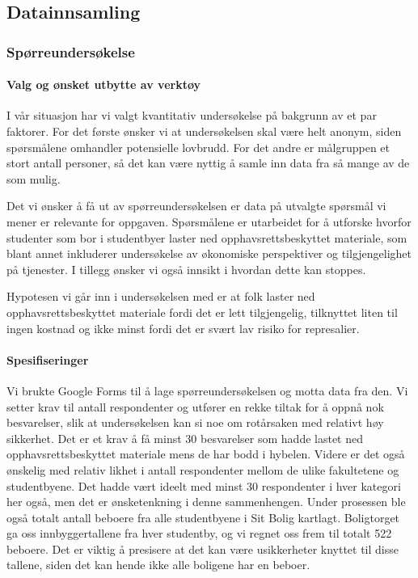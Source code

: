 \subsection{Datainnsamling}

\subsubsection{Spørreundersøkelse}

\paragraph{Valg og ønsket utbytte av verktøy}
I vår situasjon har vi valgt kvantitativ undersøkelse på bakgrunn av et par faktorer. For det første ønsker vi at undersøkelsen skal være helt anonym, siden spørsmålene omhandler potensielle lovbrudd. For det andre er målgruppen et stort antall personer, så det kan være nyttig å samle inn data fra så mange av de som mulig. 

Det vi ønsker å få ut av spørreundersøkelsen er data på utvalgte spørsmål vi mener er relevante for oppgaven. Spørsmålene er utarbeidet for å utforske hvorfor studenter som bor i studentbyer laster ned opphavsrettsbeskyttet materiale, som blant annet inkluderer undersøkelse av økonomiske perspektiver og tilgjengelighet på tjenester. I tillegg ønsker vi også innsikt i hvordan dette kan stoppes.

Hypotesen vi går inn i undersøkelsen med er at folk laster ned opphavsrettsbeskyttet materiale fordi det er lett tilgjengelig, tilknyttet liten til ingen kostnad og ikke minst fordi det er svært lav risiko for represalier.

\paragraph{Spesifiseringer}
Vi brukte Google Forms til å lage spørreundersøkelsen og motta data fra den. Vi setter krav til antall respondenter og utfører en rekke tiltak for å oppnå nok besvarelser, slik at undersøkelsen kan si noe om rotårsaken med relativt høy sikkerhet. Det er et krav å få minst 30 besvarelser som hadde lastet ned opphavsrettsbeskyttet materiale mens de har bodd i hybelen. Videre er det også ønskelig med relativ likhet i antall respondenter mellom de ulike fakultetene og studentbyene. Det hadde vært ideelt med minst 30 respondenter i hver kategori her også, men det er ønsketenkning i denne sammenhengen. Under prosessen ble også totalt antall beboere fra alle studentbyene i Sit Bolig kartlagt. Boligtorget ga oss innbyggertallene fra hver studentby, og vi regnet oss frem til totalt 522 beboere. Det er viktig å presisere at det kan være usikkerheter knyttet til disse tallene, siden det kan hende ikke alle boligene har en beboer.

